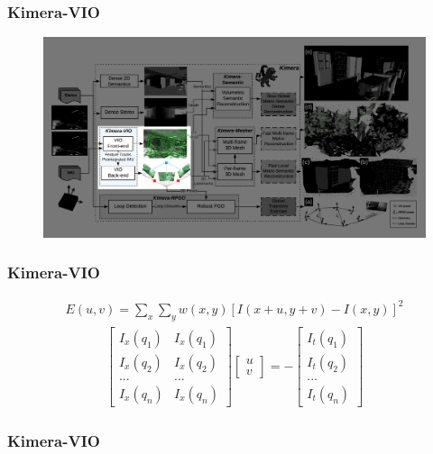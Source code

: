 \documentclass[11pt]{beamer}
\begin{document}
\begin{frame}
\frametitle{Kimera-VIO}
\begin{figure}
    \includegraphics[width=\linewidth]{kimera_chart_VIO.jpeg} 
\end{figure}
\end{frame}
\begin{frame}
    \frametitle{Kimera-VIO} 
\begin{align*}
    E(u,v) = \sum_{x} \sum_y w(x,y) [I(x+u,y+v)- I(x,y)]^2  
\end{align*}
\begin{align*}
           \begin{bmatrix}
               I_x (q_1) & I_x (q_1) \\ I_x (q_2) & I_x (q_2) \\  ... & ... \\I_x (q_n) & I_x (q_n)
           \end{bmatrix} 
           \begin{bmatrix}
               u \\ v
           \end{bmatrix} 
           = - 
           \begin{bmatrix}
               I_t (q_1) \\I_t (q_2) \\  ...\\I_t (q_n) 
           \end{bmatrix} 
\end{align*}
\end{frame}
\begin{frame}
    \frametitle{Kimera-VIO} 
    \begin{figure}[ht]
        \centering
    \end{figure}
\end{frame}
\end{document}
